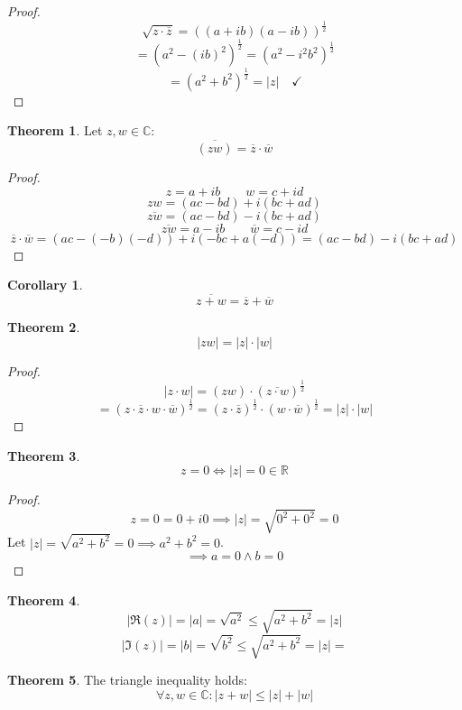 \documentclass[a4paper,landscape,twocolumn]{article}
\theoremstyle{definition}
\newtheorem{theorem}{Theorem}
\newtheorem{cor}{Corollary}
\newcommand\abs[1]{\left|#1\right|}
\begin{document}
\begin{proof}
  \[ \sqrt{z \cdot \overline{z}} = ((a + ib)(a - ib))^{\frac12} \]
  \[ = (a^2 - (ib)^2)^{\frac12} = (a^2 - i^2 b^2)^{\frac12} \]
  \[ = (a^2 + b^2)^{\frac12} = \abs{z} \quad\checkmark \]
\end{proof}

\begin{theorem}
  Let $z, w \in \mathbb C$:
  \[ \overline{(zw)} = \overline z \cdot \overline w \]
\end{theorem}

\begin{proof}
  \[ z = a + ib \qquad w = c + id \]
  \[ zw = (ac - bd) + i (bc + ad) \]
  \[ \overline{zw} = (ac - bd) - i (bc + ad) \]
  \[ \overline{zw} = a - ib \qquad \overline{w} = c - id \]
  \[
      \overline{z} \cdot \overline{w} = (ac - (-b) (-d)) + i (-bc + a(-d))
        = (ac - bd) - i (bc + ad)
  \]
\end{proof}

\begin{cor}
  \[ \overline{z + w} = \overline{z} + \overline{w} \]
\end{cor}

\begin{theorem}
  \[ \abs{zw} = \abs{z} \cdot \abs{w} \]
\end{theorem}
\begin{proof}
  \[ \abs{z \cdot w} = (zw) \cdot(\overline{z \cdot w})^{\frac12} \]
  \[
      = (z \cdot \overline z \cdot w \cdot \overline w)^{\frac12}
      = (z \cdot \overline z)^{\frac12} \cdot (w \cdot \overline w)^{\frac12}
      = \abs{z} \cdot \abs{w}
  \]
\end{proof}

\begin{theorem}
  \[ z = 0 \iff \abs{z} = 0 \in \mathbb R \]
\end{theorem}

\begin{proof}
  \[ z = 0 = 0 + i 0 \implies \abs{z} = \sqrt{0^2 + 0^2} = 0 \]
  Let $\abs{z} = \sqrt{a^2 + b^2} = 0 \implies a^2 + b^2 = 0$.
  \[ \implies a = 0 \land b = 0 \]
\end{proof}

\begin{theorem}
  \[ \abs{\Re(z)} = \abs{a} = \sqrt{a^2} \leq \sqrt{a^2 + b^2} = \abs{z} \]
  \[ \abs{\Im(z)} = \abs{b} = \sqrt{b^2} \leq \sqrt{a^2 + b^2} = \abs{z} = \]
\end{theorem}

\begin{theorem}
  The triangle inequality holds:
  \[ \forall z, w \in \mathbb C: \abs{z + w} \leq \abs{z} + \abs{w} \]
\end{theorem}
\end{document}

